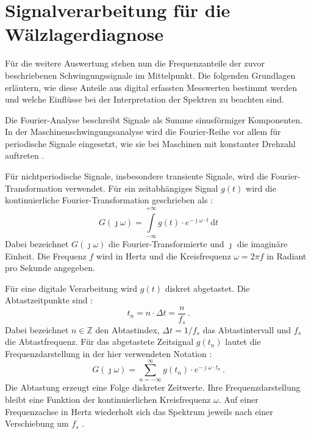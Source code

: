 \section{Signalverarbeitung für die Wälzlagerdiagnose}
\label{sec:signalverarbeitung}

Für die weitere Auswertung stehen nun die Frequenzanteile der zuvor beschriebenen
Schwingungssignale im Mittelpunkt. Die folgenden Grundlagen erläutern, wie diese
Anteile aus digital erfassten Messwerten bestimmt werden und welche Einflüsse bei
der Interpretation der Spektren zu beachten sind.


Die Fourier-Analyse beschreibt Signale als Summe sinusförmiger Komponenten. In der
Maschinenschwingungsanalyse wird die Fourier-Reihe vor allem für periodische
Signale eingesetzt, wie sie bei Maschinen mit konstanter Drehzahl auftreten
\cite[S.~67, Abschn.~3.2--3.2.1]{randallVibrationbasedConditionMonitoring2022}.

Für nichtperiodische Signale, insbesondere transiente Signale, wird die
Fourier-Transformation verwendet. Für ein zeitabhängiges Signal $g(t)$ wird die
kontinuierliche Fourier-Transformation geschrieben als
\cite[S.~68--69, Abschn.~3.2.2, Gl.~(3.23)]
{randallVibrationbasedConditionMonitoring2022}:
\begin{equation}
    G(\jmath\omega)=\int\limits_{-\infty}^{+\infty}
    g(t)\cdot e^{-\jmath\omega\cdot t}\,\mathrm{d}t
    \label{eq:continuous_fourier_transform}
\end{equation}
Dabei bezeichnet $G(\jmath\omega)$ die Fourier-Transformierte und $\jmath$ die
imaginäre Einheit. Die Frequenz $f$ wird in Hertz und die Kreisfrequenz $\omega=2\pi f$
in Radiant pro Sekunde angegeben.


Für eine digitale Verarbeitung wird $g(t)$ diskret abgetastet. Die Abtastzeitpunkte sind
\cite[S.~70, Abschn.~3.2.3]{randallVibrationbasedConditionMonitoring2022}:
\begin{equation}
    t_n=n\cdot\Delta t=\frac{n}{f_s}\,.
    \label{eq:sampling_times}
\end{equation}
Dabei bezeichnet $n\in\mathbb{Z}$ den Abtastindex, $\Delta t=1/f_s$ das Abtastintervall
und $f_s$ die Abtastfrequenz. Für das abgetastete Zeitsignal $g(t_n)$ lautet die
Frequenzdarstellung in der hier verwendeten Notation
\cite[S.~70--71, Abschn.~3.2.3, Gl.~(3.26), Abb.~3.6(c)]
{randallVibrationbasedConditionMonitoring2022}:
\begin{equation}
    G(\jmath\omega)=\sum_{n=-\infty}^{\infty}
    g(t_n)\cdot e^{-\jmath\omega\cdot t_n}\,.
    \label{eq:sampled_time_transform}
\end{equation}
Die Abtastung erzeugt eine Folge diskreter Zeitwerte. Ihre Frequenzdarstellung bleibt
eine Funktion der kontinuierlichen Kreisfrequenz $\omega$. Auf einer Frequenzachse
in Hertz wiederholt sich das Spektrum jeweils nach einer Verschiebung um $f_s$
\cite[S.~70--71, Abschn.~3.2.3, Abb.~3.6(c); S.~84--85, Abschn.~3.2.8.1,
Abb.~3.19(a)--(c)]
{randallVibrationbasedConditionMonitoring2022}.

